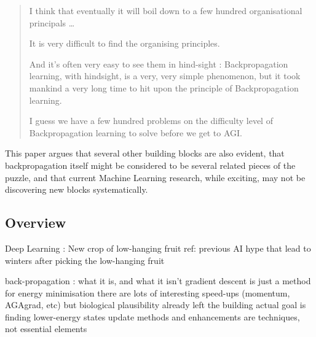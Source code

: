 \documentclass{llncs}
\begin{document}
\begin{quotation}

I think that 
eventually it will boil down to a few hundred organisational principals
\dots



It is very difficult to find the organising principles.

And it's often very easy to see them in hind-sight : 
Backpropagation learning, with hindsight, is a very, very simple phenomenon, 
but it took mankind a  very long time to hit upon the principle of Backpropagation learning. 

I guess we have a few hundred problems on the difficulty level of Backpropagation learning to solve before we get to AGI. 


\end{quotation}

This paper argues that several other building blocks are also evident, 
that backpropagation itself might be considered to be several related pieces of the puzzle,
and that current Machine Learning research, while exciting, may not be
discovering new blocks systematically.

\subsection{Overview}

Deep Learning : 
  New crop of low-hanging fruit 
    ref: previous AI hype that lead to winters after picking the low-hanging fruit

back-propagation : what it is, and what it isn't
  gradient descent is just a method for energy minimisation
    there are lots of interesting speed-ups (momentum, AGAgrad, etc)
      but biological plausibility already left the building
    actual goal is finding lower-energy states
      update methods and enhancements are techniques, not essential elements
      
\end{document}
